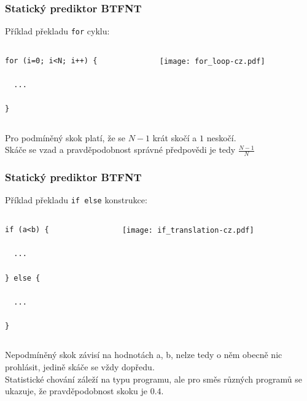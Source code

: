 \documentclass{beamer}
\begin{document}
\begin{frame}[fragile]
\frametitle{Statický prediktor BTFNT}

Příklad překladu \texttt{for} cyklu:

\begin{columns}[T]
\begin{column}{0.4\textwidth}
\begin{verbatim}
for (i=0; i<N; i++) {

  ...
  
}
\end{verbatim}
\end{column}
\begin{column}{0.6\textwidth}
\texttt{[image: for\_loop-cz.pdf]}
\end{column}
\end{columns}
\bigskip
Pro podmíněný skok platí, že se $N-1$ krát skočí a $1$ neskočí.\\
Skáče se vzad a pravděpodobnost správné předpovědi je tedy $\frac{N-1}{N}$

\end{frame}

\begin{frame}[fragile]
\frametitle{Statický prediktor BTFNT}

Příklad překladu \texttt{if else} konstrukce:

\begin{columns}[T]
\begin{column}{0.4\textwidth}
\begin{verbatim}
if (a<b) {
  
  ...

} else {

  ...

}
\end{verbatim}
\end{column}
\begin{column}{0.6\textwidth}
\texttt{[image: if\_translation-cz.pdf]}
\end{column}
\end{columns}
\bigskip
Nepodmíněný skok závisí na hodnotách a, b, nelze tedy o něm obecně nic prohlásit, jedině skáče se vždy dopředu.\\
Statistické chování záleží na typu programu, ale pro směs různých programů se ukazuje, že pravděpodobnost skoku je $0.4$.

\end{frame}
\end{document}
